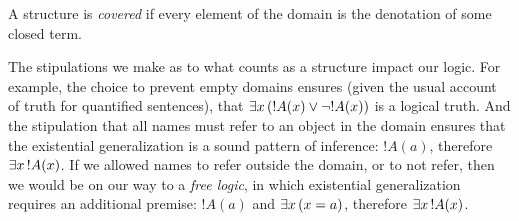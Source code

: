 \documentclass[open-logic-section]{subfiles}
\begin{document}
\begin{defn}
A structure is \emph{covered} if every element of the domain is the
denotation of some closed term.
\end{defn}

The stipulations we make as to what counts as a structure impact our
logic. For example, the choice to prevent empty domains ensures (given
the usual account of truth for quantified sentences), that
$\lexists[x][(!A(x) \lor \lnot !A(x))]$ is a logical truth. And the
stipulation that all names must refer to an object in the domain
ensures that the existential generalization is a sound pattern of
inference: $!A(a)$, therefore $\lexists[x][!A(x)]$. If we allowed names
to refer outside the domain, or to not refer, then we would be on our
way to a \emph{free logic}, in which existential generalization
requires an additional premise: $!A(a)$ and $\lexists[x][(x=a)]$,
therefore $\lexists[x][!A(x)]$.
\end{document}
